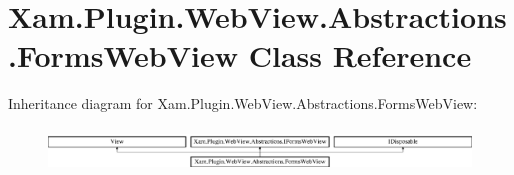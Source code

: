 \hypertarget{class_xam_1_1_plugin_1_1_web_view_1_1_abstractions_1_1_forms_web_view}{}\section{Xam.\+Plugin.\+Web\+View.\+Abstractions.\+Forms\+Web\+View Class Reference}
\label{class_xam_1_1_plugin_1_1_web_view_1_1_abstractions_1_1_forms_web_view}
Inheritance diagram for Xam.\+Plugin.\+Web\+View.\+Abstractions.\+Forms\+Web\+View\+:\begin{figure}[H]
\begin{center}
\leavevmode
\includegraphics[height=1.204301cm]{class_xam_1_1_plugin_1_1_web_view_1_1_abstractions_1_1_forms_web_view}
\end{center}
\end{figure}
